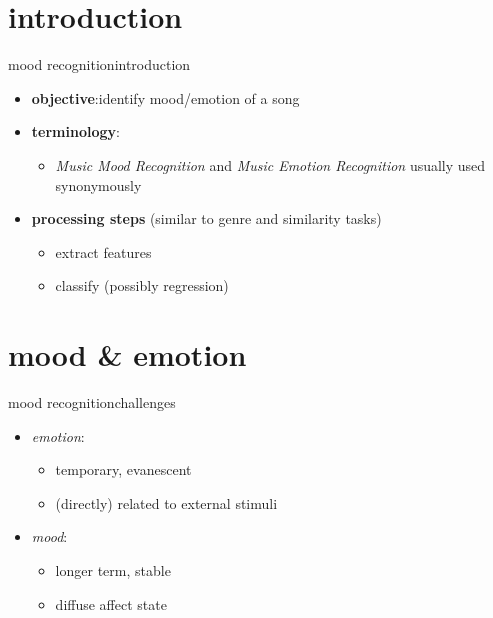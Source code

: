     \section[intro]{introduction}
        \begin{frame}{mood recognition}{introduction}
            
            \begin{itemize}
                \item	\textbf{objective}:identify mood/emotion of a song
                \item<2->   \textbf{terminology}:
                    \begin{itemize}
                        \item \textit{Music Mood Recognition} and \textit{Music Emotion Recognition} usually used synonymously
                    \end{itemize}
                \bigskip
                \item<3->   \textbf{processing steps} (similar to genre and similarity tasks)
                    \begin{itemize}
                        \item   extract features
                        \item   classify (possibly regression)
                    \end{itemize}
            \end{itemize}
        \end{frame}
   
    \section[mood]{mood \& emotion}
        \begin{frame}{mood recognition}{challenges}
            \begin{itemize}
                \item	\textit{emotion}: 
                    \begin{itemize}
                        \item   temporary, evanescent
                        \item   (directly) related to external stimuli
                    \end{itemize}
                \item	\textit{mood}: 
                    \begin{itemize}
                        \item   longer term, stable
                        \item   diffuse affect state
                    \end{itemize}
            \end{itemize}
        \end{frame}
            
